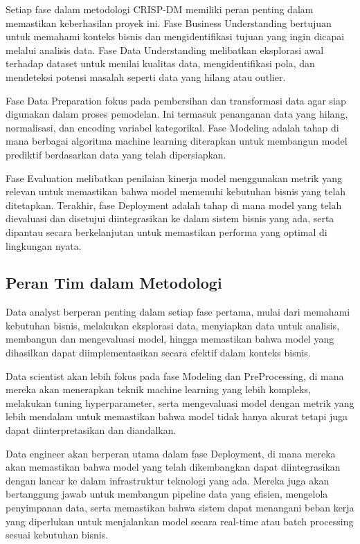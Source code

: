 Setiap fase dalam metodologi CRISP-DM memiliki peran penting dalam memastikan keberhasilan proyek ini. Fase Business Understanding bertujuan untuk memahami konteks bisnis dan mengidentifikasi tujuan yang ingin dicapai melalui analisis data. Fase Data Understanding melibatkan eksplorasi awal terhadap dataset untuk menilai kualitas data, mengidentifikasi pola, dan mendeteksi potensi masalah seperti data yang hilang atau outlier.

Fase Data Preparation fokus pada pembersihan dan transformasi data agar siap digunakan dalam proses pemodelan. Ini termasuk penanganan data yang hilang, normalisasi, dan encoding variabel kategorikal. Fase Modeling adalah tahap di mana berbagai algoritma machine learning diterapkan untuk membangun model prediktif berdasarkan data yang telah dipersiapkan. 

Fase Evaluation melibatkan penilaian kinerja model menggunakan metrik yang relevan untuk memastikan bahwa model memenuhi kebutuhan bisnis yang telah ditetapkan. Terakhir, fase Deployment adalah tahap di mana model yang telah dievaluasi dan disetujui diintegrasikan ke dalam sistem bisnis yang ada, serta dipantau secara berkelanjutan untuk memastikan performa yang optimal di lingkungan nyata.

\subsection{Peran Tim dalam Metodologi}

Data analyst berperan penting dalam setiap fase pertama, mulai dari memahami kebutuhan bisnis, melakukan eksplorasi data, menyiapkan data untuk analisis, membangun dan mengevaluasi model, hingga memastikan bahwa model yang dihasilkan dapat diimplementasikan secara efektif dalam konteks bisnis.

Data scientist akan lebih fokus pada fase Modeling dan PreProcessing, di mana mereka akan menerapkan teknik machine learning yang lebih kompleks, melakukan tuning hyperparameter, serta mengevaluasi model dengan metrik yang lebih mendalam untuk memastikan bahwa model tidak hanya akurat tetapi juga dapat diinterpretasikan dan diandalkan.

Data engineer akan berperan utama dalam fase Deployment, di mana mereka akan memastikan bahwa model yang telah dikembangkan dapat diintegrasikan dengan lancar ke dalam infrastruktur teknologi yang ada. Mereka juga akan bertanggung jawab untuk membangun pipeline data yang efisien, mengelola penyimpanan data, serta memastikan bahwa sistem dapat menangani beban kerja yang diperlukan untuk menjalankan model secara real-time atau batch processing sesuai kebutuhan bisnis.

